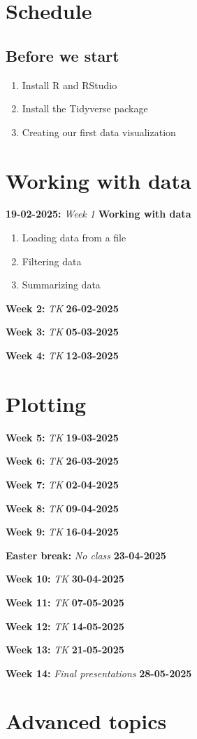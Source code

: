 \documentclass{article}
\newcommand{\week}[3]{
    \begin{center}
        \textbf{#1:} \textit{#2} \dotfill \textbf{#3}
    \end{center}
}
\begin{document}
\section*{Schedule}

\subsection*{Before we start}
\begin{enumerate}
    \item Install R and RStudio
    \item Install the Tidyverse package
    \item Creating our first data visualization
\end{enumerate}

\section{Working with data}

\week{19-02-2025}{Week 1}{Working with data}

\begin{enumerate}
    \item Loading data from a file
    \item Filtering data
    \item Summarizing data
\end{enumerate}

\week{Week 2}{TK}{26-02-2025}
\week{Week 3}{TK}{05-03-2025}
\week{Week 4}{TK}{12-03-2025}
\section{Plotting}

\week{Week 5}{TK}{19-03-2025}
\week{Week 6}{TK}{26-03-2025}
\week{Week 7}{TK}{02-04-2025}
\week{Week 8}{TK}{09-04-2025}
\week{Week 9}{TK}{16-04-2025}
\week{Easter break}{No class}{23-04-2025}
\week{Week 10}{TK}{30-04-2025}
\week{Week 11}{TK}{07-05-2025}
\week{Week 12}{TK}{14-05-2025}
\week{Week 13}{TK}{21-05-2025}
\week{Week 14}{Final presentations}{28-05-2025}


\section{Advanced topics}
\end{document}
